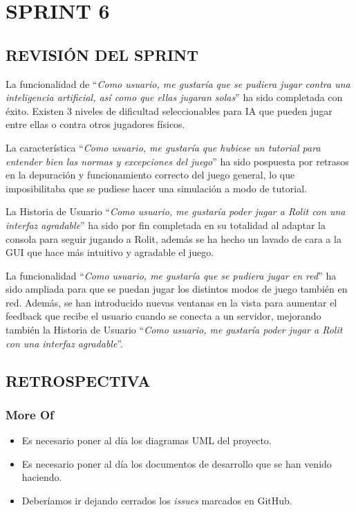 \documentclass[../../SCRUM.tex]{subfiles}
\begin{document}
\section{SPRINT 6}
\subsection{REVISIÓN DEL SPRINT}
La funcionalidad de ``\textit{Como usuario, me gustaría que se pudiera jugar contra una inteligencia artificial, así como que ellas jugaran solas}'' ha sido completada con éxito. Existen 3 niveles de dificultad seleccionables para IA que pueden jugar entre ellas o contra otros jugadores físicos.

La característica ``\textit{Como usuario, me gustaría que hubiese un tutorial para entender bien las normas y excepciones del juego}'' ha sido pospuesta por retrasos en la depuración y funcionamiento correcto del juego general, lo que imposibilitaba que se pudiese hacer una simulación a modo de tutorial.

La Historia de Usuario ``\textit{Como usuario, me gustaría poder jugar a Rolit con una interfaz agradable}'' ha sido por fin completada en su totalidad al adaptar la consola para seguir jugando a Rolit, además se ha hecho un lavado de cara a la GUI que hace más intuitivo y agradable el juego.

La funcionalidad ``\textit{Como usuario, me gustaría que se pudiera jugar en red}'' ha sido ampliada para que se puedan jugar los distintos modos de juego también en red. Además, se han introducido nuevas ventanas en la vista para aumentar el feedback que recibe el usuario cuando se conecta a un servidor, mejorando también la Historia de Usuario ``\textit{Como usuario, me gustaría poder jugar a Rolit con una interfaz agradable}''.

\subsection{RETROSPECTIVA}
\subsubsection{More Of}
\begin{itemize}
\item Es necesario poner al día los diagramas UML del proyecto.
\item Es necesario poner al día los documentos de desarrollo que se han venido haciendo.
\item Deberíamos ir dejando cerrados los \textit{issues} marcados en GitHub.
\end{itemize}
\end{document}
